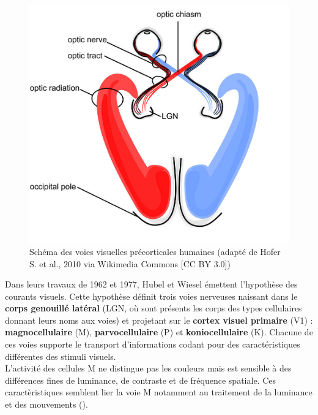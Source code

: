 \begin{figure}[th]
\centering
\includegraphics{Figures/visual_system}
\decoRule %
\caption[Figure]{Schéma des voies visuelles précorticales humaines (adapté de Hofer S. et al., 2010 via Wikimedia Commons [CC BY 3.0])}
\label{fig:visual_system}
\end{figure}

Dans leurs travaux de 1962 et 1977, Hubel et Wiesel émettent l'hypothèse des courants visuels. Cette hypothèse définit trois voies nerveuses naissant dans le \textbf{corps genouillé latéral} (LGN, où sont présents les corps des types cellulaires donnant leurs noms aux voies) et projetant sur le \textbf{cortex visuel primaire} (V1) :  \textbf{magnocellulaire} (M),  \textbf{parvocellulaire} (P) et  \textbf{koniocellulaire} (K). Chacune de ces voies supporte le transport d'informations codant pour des caractéristiques différentes des stimuli visuels.\\
L'activité des cellules M ne distingue pas les couleurs mais est sensible à des différences fines de luminance, de contraste et de fréquence spatiale. Ces caractèristiques semblent lier la voie M notamment au traitement de la luminance et des mouvements (\cite{Werner2014}).

